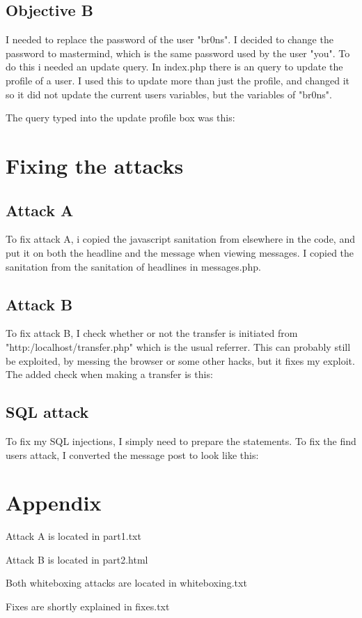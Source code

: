 \documentclass{article}
\begin{document}
\subsection{Objective B}
I needed to replace the password of the user "br0ns". I decided to change the password to mastermind, which is the same password used by the user "you". To do this i needed an update query. In index.php there is an query to update the profile of a user. I used this to update more than just the profile, and changed it so it did not update the current users variables, but the variables of "br0ns".

The query typed into the update profile box was this:



\section{Fixing the attacks}
\subsection{Attack A}
To fix attack A, i copied the javascript sanitation from elsewhere in the code, and put it on both the headline and the message when viewing messages. I copied the sanitation from the sanitation of headlines in messages.php.
\subsection{Attack B}
To fix attack B, I check whether or not the transfer is initiated from "http:/localhost/transfer.php" which is the usual referrer. This can probably still be exploited, by messing the browser or some other hacks, but it fixes my exploit. The added check when making a transfer is this:

\subsection{SQL attack}
To fix my SQL injections, I simply need to prepare the statements. To fix the find users attack, I converted the message post to look like this:


\section{Appendix}
Attack A is located in part1.txt

Attack B is located in part2.html

Both whiteboxing attacks are located in whiteboxing.txt

Fixes are shortly explained in fixes.txt
\end{document}
